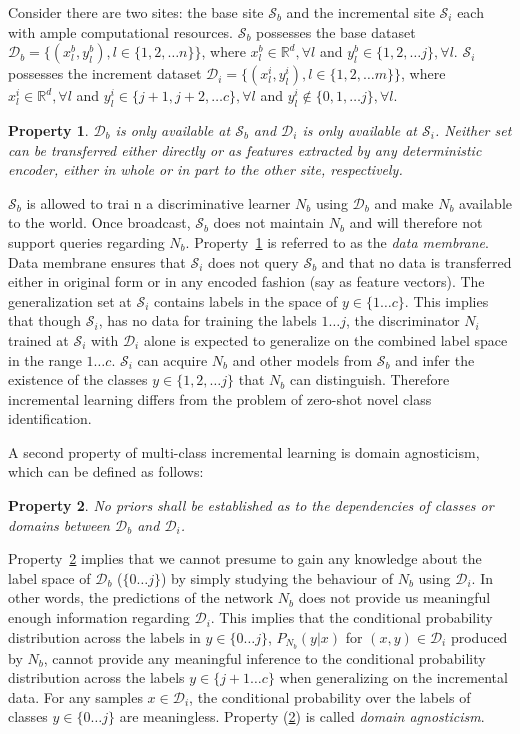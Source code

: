 \documentclass[10pt,twocolumn,letterpaper]{article}
\newtheorem{property}{Property}
\def \bbR{{\mathbb{R}}}
\def \cS{{\mathcal{S}}}
\def \cD{{\mathcal{D}}}
\begin{document}
	Consider there are two sites: the base site $\cS_b$ and the incremental site $\cS_i$ each with ample computational resources.
	$\cS_b$ possesses the base dataset $\cD_b = \{(x_l^b,y_l^b), l\in \{1,2, \hdots n\}\}$, where $x_l^b \in {\bbR^d}, \forall l$ and $y_l^b \in \{1,2, \hdots j\}, \forall l$.
	$\cS_i$ possesses the increment dataset $\cD_i=\{(x_l^i,y_l^i), l\in \{1,2, \hdots m\}\}$, where $x_l^i \in {\bbR^d}, \forall l$ and $y_l^i \in \{j+1, j+2, \hdots c\}, \forall l$ and $y_l^i \not\in \{0, 1, \hdots j\}, \forall l$.
	
	\begin{property}
		\label{prop:membrane}
		$\cD_b$ is only available at $\cS_b$ and  $\cD_i$ is only available at $\cS_i$. 
		Neither set can be transferred either directly or as features extracted by any deterministic encoder, either in whole or in part to the other site, respectively. 
	\end{property}
	$\cS_b$ is allowed to trai n a discriminative learner $N_b$ using $\cD_b$ and make $N_b$ available to the world. 
	Once broadcast, $\cS_b$ does not maintain $N_b$ and will therefore not support queries regarding $N_b$. Property~\ref{prop:membrane} is referred to as the \emph{data membrane}. 
	Data membrane ensures that $\cS_i$ does not query $\cS_b$ and that no data is transferred either in original form or in any encoded fashion (say as feature vectors). 
	The generalization set at $\cS_i$ contains labels in the space of  $y \in\{1 \hdots c\}$. 
	This implies that though $\cS_i$, has no data for training the labels $1 \hdots j$, the discriminator $N_i$ trained at $\cS_i$ with $\cD_i$ alone is expected to generalize on the combined label space in the range $1 \hdots c$. 
	$\cS_i$ can acquire $N_b$ and other models from $\cS_b$ and infer the existence of the classes $y \in \{1,2, \hdots j\}$ that $N_b$ can distinguish. Therefore incremental learning differs from the problem of zero-shot novel class identification.
	
	A second property of multi-class incremental learning is domain agnosticism, which can be defined as follows:	
	\begin{property}
		\label{prop:agnostic}
		No priors shall be established as to the dependencies of classes or domains between $\cD_b$ and $\cD_i$. 
	\end{property}
	Property~\ref{prop:agnostic} implies that we cannot presume to gain any knowledge about the label space of $\cD_b$ ($\{0 \hdots j\}$) by simply studying the behaviour of $N_b$ using $\cD_i$.
	In other words, the predictions of the network $N_b$ does not provide us meaningful enough information regarding $\cD_i$. 
	This implies that the conditional probability distribution across the labels in $y \in \{0 \hdots j\}$, $P_{N_b}(y|x)$ for $(x,y)\in\cD_i$ produced by $N_b$, cannot provide any meaningful inference to the conditional probability distribution across the labels $y \in \{j+1 \hdots c\}$ when generalizing on the incremental data. 
	For any samples $x \in \cD_i$, the conditional probability over the labels of classes $y \in \{0 \hdots j\}$ are meaningless. 
	Property (\ref{prop:agnostic}) is called \emph{domain agnosticism}. 
	
\end{document}
